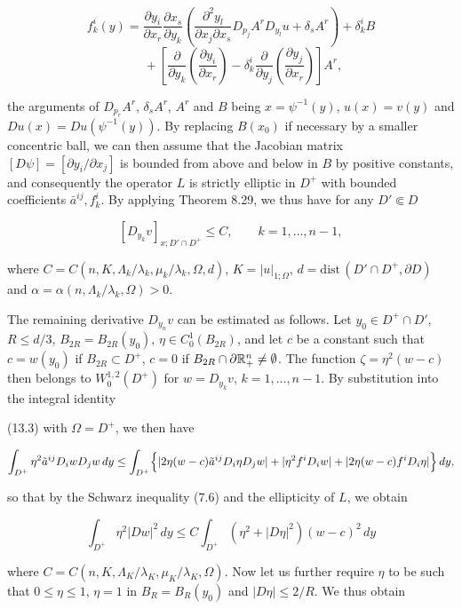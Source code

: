\[
f_k^i(y)=\frac{\partial y_i}{\partial x_r}\frac{\partial x_s}{\partial y_k}
\left(\frac{\partial^2 y_l}{\partial x_j \partial x_s}D_{p_j}A^r D_{y_l}u+\delta_s A^r\right)+\delta_k^i B
\]
\[
\qquad + \left[\frac{\partial}{\partial y_k}\!\left(\frac{\partial y_i}{\partial x_r}\right)-\delta_k^i\frac{\partial}{\partial y_j}\!\left(\frac{\partial y_j}{\partial x_r}\right)\right]A^r,
\]

the arguments of $D_{p_r}A^r$, $\delta_s A^r$, $A^r$ and $B$ being $x=\psi^{-1}(y)$, $u(x)=v(y)$ and $Du(x)=Du(\psi^{-1}(y))$. By replacing $B(x_0)$ if necessary by a smaller concentric ball, we can then assume that the Jacobian matrix $[D\psi]=[\partial y_i/\partial x_j]$ is bounded from above and below in $B$ by positive constants, and consequently the operator $L$ is strictly elliptic in $D^+$ with bounded coefficients $\bar a^{ij}, f_k^i$. By applying Theorem 8.29, we thus have for any $D' \Subset D$

\begin{equation}\tag{13.7}
[D_{y_k}v]_{x;D'\cap D^+}\le C,\qquad k=1,\ldots,n-1,
\end{equation}

where $C=C(n,K,\Lambda_k/\lambda_k,\mu_k/\lambda_k,\Omega,d)$, $K=|u|_{1;\Omega}$, $d=\mathrm{dist}\,(D'\cap D^+,\partial D)$ and $\alpha=\alpha(n,\Lambda_k/\lambda_k,\Omega)>0$.

The remaining derivative $D_{y_n}v$ can be estimated as follows. Let $y_0\in D^+\cap D'$, $R\le d/3$, $B_{2R}=B_{2R}(y_0)$, $\eta\in C^1_0(B_{2R})$, and let $c$ be a constant such that $c=w(y_0)$ if $B_{2R}\subset D^+$, $c=0$ if $B_{2R}\cap \partial \mathbb{R}^n_+\ne \emptyset$. The function $\zeta=\eta^2(w-c)$ then belongs to $W^{1,2}_0(D^+)$ for $w=D_{y_k}v$, $k=1,\ldots,n-1$. By substitution into the integral identity



(13.3) with $\Omega = D^+$, we then have

\[
\int_{D^+} \eta^2 \tilde a^{ij} D_i w D_j w\,dy
\leq \int_{D^+} \Bigl\{|2\eta(w-c)\tilde a^{ij}D_i\eta D_j w|
+ |\eta^2 f^i D_i w| + |2\eta(w-c)f^iD_i\eta|\Bigr\}\,dy,
\]

so that by the Schwarz inequality (7.6) and the ellipticity of $L$, we obtain

\[
\int_{D^+} \eta^2|Dw|^2\,dy \leq C \int_{D^+} (\eta^2 + |D\eta|^2)(w-c)^2\,dy
\]

where $C = C(n,K,\Lambda_K/\lambda_K,\mu_K/\lambda_K,\Omega)$. Now let us further require $\eta$ to be such that
$0 \leq \eta \leq 1$, $\eta = 1$ in $B_R = B_R(y_0)$ and $|D\eta| \leq 2/R$. We thus obtain

